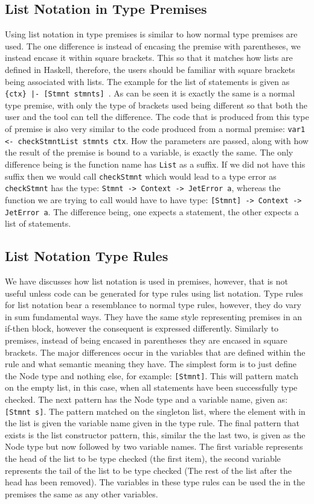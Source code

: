 \subsection{List Notation in Type Premises}
Using list notation in type premises is similar to how normal type premises are used.
The one difference is instead of encasing the premise with parentheses, we instead encase it within square brackets.
This so that it matches how lists are defined in Haskell, therefore, the users should be familiar with square brackets being associated with lists.
The example for the list of statements is given as \texttt{\{ctx\} |- [Stmnt stmnts] }.
As can be seen it is exactly the same is a normal type premise, with only the type of brackets used being different so that both the user and the tool can tell the difference.
The code that is produced from this type of premise is also very similar to the code produced from a normal premise: \texttt{var1 <- checkStmntList stmnts ctx}.
How the parameters are passed, along with how the result of the premise is bound to a variable, is exactly the same.
The only difference being is the function name has \texttt{List} as a suffix.
If we did not have this suffix then we would call \texttt{checkStmnt} which would lead to a type error as \texttt{checkStmnt} has the type: \texttt{Stmnt -> Context -> JetError a}, whereas the function we are trying to call would have to have type: \texttt{[Stmnt] -> Context -> JetError a}.
The difference being, one expects a statement, the other expects a list of statements.

\subsection{List Notation Type Rules}
We have discusses how list notation is used in premises, however, that is not useful unless code can be generated for type rules using list notation.
Type rules for list notation bear a resemblance to normal type rules, however, they do vary in sum fundamental ways.
They have the same style representing premises in an if-then block, however the consequent is expressed differently.
Similarly to premises, instead of being encased in parentheses they are encased in square brackets.
The major differences occur in the variables that are defined within the rule and what semantic meaning they have.
The simplest form is to just define the Node type and nothing else, for example: \texttt{[Stmnt]}.
This will pattern match on the empty list, in this case, when all statements have been successfully type checked.
The next pattern has the Node type and a variable name, given as: \texttt{[Stmnt s]}.
The pattern matched on the singleton list, where the element with in the list is given the variable name given in the type rule.
The final pattern that exists is the list constructor pattern, this, similar the the last two,  is given as the Node type but now followed by two variable names.
The first variable represents the head of the list to be type checked (the first item), the second variable represents the tail of the list to be type checked (The rest of the list after the head has been removed).
The variables in these type rules can be used the in the premises the same as any other variables.

